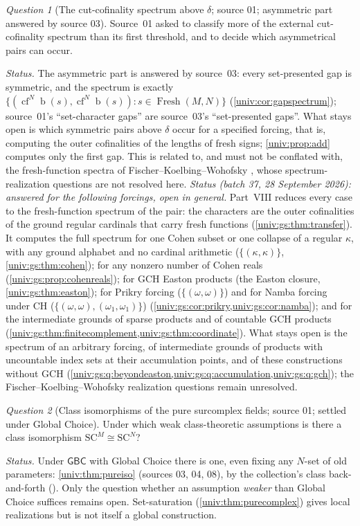 \documentclass[11pt,letterpaper]{article}
\numberwithin{equation}{section}
\theoremstyle{definition}
\theoremstyle{remark}
\newtheorem{question}[question]{Question}
\newcommand{\SC}{\mathrm{SC}}
\newcommand{\SCM}{\SC^{M}}
\newcommand{\SCN}{\SC^{N}}
\newcommand{\bd}{\operatorname{b}}
\newcommand{\cf}{\operatorname{cf}}
\newcommand{\Fresh}{\operatorname{Fresh}}
\newcommand{\GBC}{\mathsf{GBC}}
\begin{document}
\begin{question}[The cut-cofinality spectrum above $\delta$; source 01; asymmetric part answered by source 03]\label{univ:q:cutspectrum}
Source~01 asked to classify more of the external cut-cofinality spectrum than
its first threshold, and to decide which asymmetrical pairs can occur.
\end{question}
\emph{Status.} The asymmetric part is answered by source~03: every
set-presented gap is symmetric, and the spectrum is exactly
$\{(\cf^N\bd(s),\cf^N\bd(s)):s\in\Fresh(M,N)\}$
(\cref{univ:cor:gapspectrum}); source~01's ``set-character gaps'' are source~03's
``set-presented gaps''. What stays open is which symmetric pairs above $\delta$
occur for a specified forcing, that is, computing the outer cofinalities of the
lengths of fresh signs; \cref{univ:prop:add} computes only the first gap. This
is related to, and must not be conflated with, the fresh-function spectra of
Fischer--Koelbing--Wohofsky \cite{FKW}, whose spectrum-realization questions
are not resolved here.
\emph{Status (batch 37, 28 September 2026): answered for the following
forcings, open in general.} Part~VIII reduces every case to the fresh-function
spectrum of the pair: the characters are the outer cofinalities of the ground
regular cardinals that carry fresh functions (\cref{univ:gs:thm:transfer}). It
computes the full spectrum for one Cohen subset or one collapse of a regular
$\kappa$, with any ground alphabet and no cardinal arithmetic
($\{(\kappa,\kappa)\}$, \cref{univ:gs:thm:cohen}); for any nonzero number of
Cohen reals (\cref{univ:gs:prop:cohenreals}); for GCH Easton products (the Easton
closure, \cref{univ:gs:thm:easton}); for Prikry forcing ($\{(\omega,\omega)\}$)
and for Namba forcing under CH ($\{(\omega,\omega),(\omega_1,\omega_1)\}$)
(\cref{univ:gs:cor:prikry,univ:gs:cor:namba}); and for the intermediate grounds
of sparse products and of countable GCH products
(\cref{univ:gs:thm:finitecomplement,univ:gs:thm:coordinate}). What stays open is
the spectrum of an arbitrary forcing, of intermediate grounds of products with
uncountable index sets at their accumulation points, and of these constructions
without GCH (\cref{univ:gs:q:beyondeaston,univ:gs:q:accumulation,univ:gs:q:gch});
the Fischer--Koelbing--Wohofsky realization questions remain unresolved.

\begin{question}[Class isomorphisms of the pure surcomplex fields; source 01; settled under Global Choice]\label{univ:q:classiso}
Under which weak class-theoretic assumptions is there a class isomorphism
$\SCM\cong\SCN$?
\end{question}
\emph{Status.} Under $\GBC$ with Global Choice there is one, even fixing any
$N$-set of old parameters: \cref{univ:thm:pureiso} (sources 03, 04, 08), by the
collection's class back-and-forth (). Only the
question whether an assumption \emph{weaker} than Global Choice suffices
remains open. Set-saturation (\cref{univ:thm:purecomplex}) gives local
realizations but is not itself a global construction.
\end{document}
